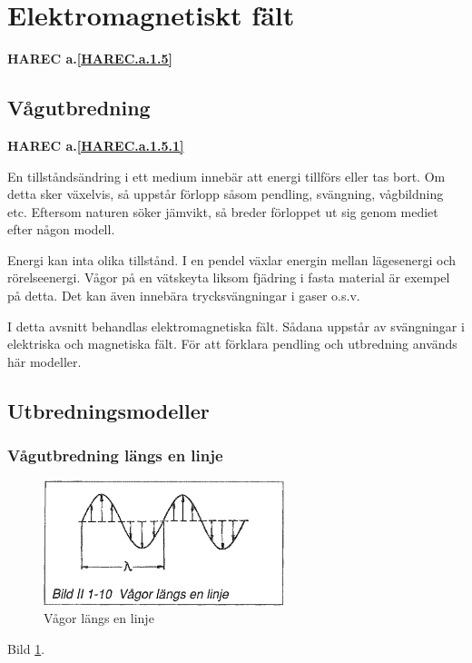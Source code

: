 \section{Elektromagnetiskt fält}
\textbf{HAREC a.\ref{HAREC.a.1.5}\label{myHAREC.a.1.5}}

\subsection{Vågutbredning}
\textbf{HAREC a.\ref{HAREC.a.1.5.1}\label{myHAREC.a.1.5.1}}

En tillståndsändring i ett medium innebär att energi tillförs eller tas bort.
Om detta sker växelvis, så uppstår förlopp såsom pendling, svängning,
vågbildning etc.
Eftersom naturen söker jämvikt, så breder förloppet ut sig genom mediet efter
någon modell.

Energi kan inta olika tillstånd. I en pendel växlar energin mellan lägesenergi
och rörelseenergi. Vågor på en vätskeyta liksom fjädring i fasta material är
exempel på detta. Det kan även innebära trycksvängningar i gaser o.s.v.

I detta avsnitt behandlas elektromagnetiska fält. Sådana uppstår av svängningar
i elektriska och magnetiska fält. För att förklara pendling och utbredning
används här modeller.

\subsection{Utbredningsmodeller}

\subsubsection{Vågutbredning längs en linje}

\begin{figure}[h]
\begin{center}
\includegraphics[width=7cm]{images/bild_2_1-10}
\caption{Vågor längs en linje}
\label{fig:BildII1-10}
\end{center}
\end{figure}

Bild \ref{fig:BildII1-10}.

